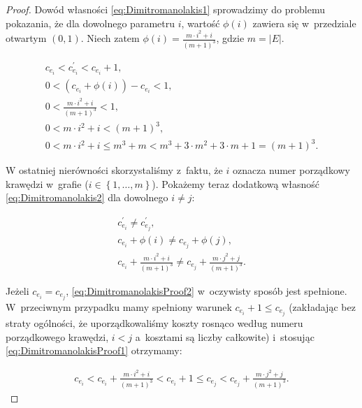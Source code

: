 \begin{proof}
	Dowód własności \ref{eq:Dimitromanolakis1} sprowadzimy do problemu pokazania, że dla dowolnego parametru $i$, wartość $\phi \left( i \right)$ zawiera się w~przedziale otwartym $\left( 0, 1 \right)$.
	Niech zatem $\phi \left( i \right) = \frac{m \cdot i^{2} + i}{\left( m + 1 \right)^{3}}$, gdzie $m = \left| E \right|$.
	
	\begin{gather}
		c_{e_{i}} < c^{\prime}_{e_{i}} < c_{e_{i}} + 1\text{,}\nonumber\\
		0 < \left( c_{e_{i}} + \phi \left( i \right) \right) - c_{e_{i}} < 1\text{,}\nonumber\\
		0 < \frac{m \cdot i^{2} + i}{\left( m + 1 \right)^{3}} < 1\text{,}\label{eq:DimitromanolakisProof1}\\
		0 < m \cdot i^{2} + i < \left( m + 1 \right)^{3}\text{,}\nonumber\\
		0 < m \cdot i^{2} + i \leqslant m^{3} + m < m^{3} + 3 \cdot m^2 + 3 \cdot m + 1 = \left( m + 1 \right)^{3}\nonumber\text{.}
	\end{gather}
	
	W ostatniej nierówności skorzystaliśmy z~faktu, że $i$ oznacza numer porządkowy krawędzi w~grafie ($i \in \left\{ 1, \dots, m \right\}$).
	Pokażemy teraz dodatkową własność \ref{eq:Dimitromanolakis2} dla dowolnego $i \neq j$:
	
	\begin{gather}
		c^{\prime}_{e_{i}} \neq c^{\prime}_{e_{j}}\text{,}\nonumber\\
		c_{e_{i}} + \phi \left( i \right) \neq c_{e_{j}} + \phi \left( j \right)\text{,}\nonumber\\
		c_{e_{i}} + \frac{m \cdot i^{2} + i}{\left( m + 1 \right)^{3}} \neq c_{e_{j}} + \frac{m \cdot j^{2} + j}{\left( m + 1 \right)^{3}}\text{.}\label{eq:DimitromanolakisProof2}
	\end{gather}
	
	Jeżeli $c_{e_{i}} = c_{e_{j}}$, \ref{eq:DimitromanolakisProof2} w~oczywisty sposób jest spełnione.
	W~przeciwnym przypadku mamy spełniony warunek $c_{e_{i}} + 1 \leqslant c_{e_{j}}$ (zakładając bez straty ogólności, że uporządkowaliśmy koszty rosnąco według numeru porządkowego krawędzi, $i < j$ a~kosztami są liczby całkowite) i~stosując \ref{eq:DimitromanolakisProof1} otrzymamy:
	
	\begin{gather*}
		c_{e_{i}} < c_{e_{i}} + \frac{m \cdot i^{2} + i}{\left( m + 1 \right)^{3}} < c_{e_{i}} + 1 \leqslant c_{e_{j}} < c_{e_{j}} + \frac{m \cdot j^{2} + j}{\left( m + 1 \right)^{3}}\text{.}
	\end{gather*}
	
\end{proof}


